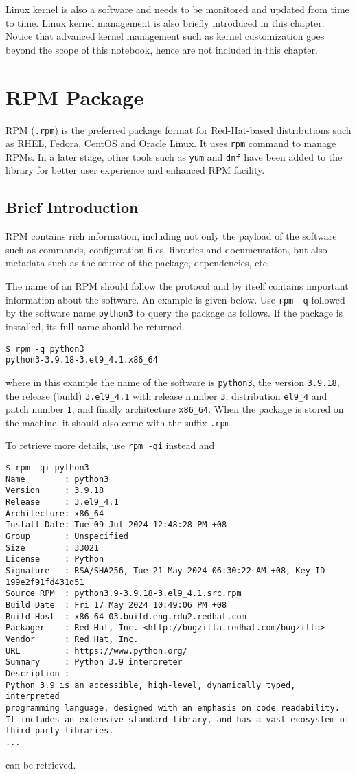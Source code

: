 Linux kernel is also a software and needs to be monitored and updated from time to time. Linux kernel management is also briefly introduced in this chapter. Notice that advanced kernel management such as kernel customization goes beyond the scope of this notebook, hence are not included in this chapter.

\section{RPM Package}

RPM (\verb|.rpm|) is the preferred package format for Red-Hat-based distributions such as RHEL, Fedora, CentOS and Oracle Linux. It uses \verb|rpm| command to manage RPMs. In a later stage, other tools such as \verb|yum| and \verb|dnf| have been added to the library for better user experience and enhanced RPM facility. 

\subsection{Brief Introduction}

RPM contains rich information, including not only the payload of the software such as commands, configuration files, libraries and documentation, but also metadata such as the source of the package, dependencies, etc.

The name of an RPM should follow the protocol and by itself contains important information about the software. An example is given below. Use \verb|rpm -q| followed by the software name \verb|python3| to query the package as follows. If the package is installed, its full name should be returned.
\begin{lstlisting}
$ rpm -q python3
python3-3.9.18-3.el9_4.1.x86_64
\end{lstlisting}
where in this example the name of the software is \verb|python3|, the version \verb|3.9.18|, the release (build) \verb|3.el9_4.1| with release number \verb|3|, distribution \verb|el9_4| and patch number \verb|1|, and finally architecture \verb|x86_64|. When the package is stored on the machine, it should also come with the suffix \verb|.rpm|. 

To retrieve more details, use \verb|rpm -qi| instead and
\begin{lstlisting}
$ rpm -qi python3
Name        : python3
Version     : 3.9.18
Release     : 3.el9_4.1
Architecture: x86_64
Install Date: Tue 09 Jul 2024 12:48:28 PM +08
Group       : Unspecified
Size        : 33021
License     : Python
Signature   : RSA/SHA256, Tue 21 May 2024 06:30:22 AM +08, Key ID 199e2f91fd431d51
Source RPM  : python3.9-3.9.18-3.el9_4.1.src.rpm
Build Date  : Fri 17 May 2024 10:49:06 PM +08
Build Host  : x86-64-03.build.eng.rdu2.redhat.com
Packager    : Red Hat, Inc. <http://bugzilla.redhat.com/bugzilla>
Vendor      : Red Hat, Inc.
URL         : https://www.python.org/
Summary     : Python 3.9 interpreter
Description :
Python 3.9 is an accessible, high-level, dynamically typed, interpreted
programming language, designed with an emphasis on code readability.
It includes an extensive standard library, and has a vast ecosystem of
third-party libraries.
...
\end{lstlisting}
can be retrieved.

